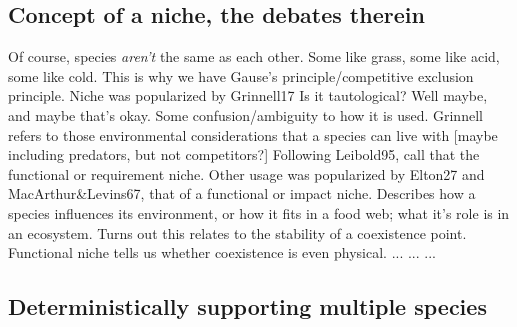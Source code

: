 \documentclass[a4paper,11pt]{article}
\numberwithin{equation}{section} %
\begin{document}
\subsection{Concept of a niche, the debates therein}
Of course, species \emph{aren't} the same as each other. Some like grass, some like acid, some like cold. 
This is why we have Gause's principle/competitive exclusion principle. 
Niche was popularized by Grinnell17
Is it tautological? Well maybe, and maybe that's okay. 
%
Some confusion/ambiguity to how it is used. 
Grinnell refers to those environmental considerations that a species can live with [maybe including predators, but not competitors?]
Following Leibold95, call that the functional or requirement niche. 
%
Other usage was popularized by Elton27 and MacArthur\&Levins67, that of a functional or impact niche. 
Describes how a species influences its environment, or how it fits in a food web; what it's role is in an ecosystem. 
Turns out this relates to the stability of a coexistence point. 
%
Functional niche tells us whether coexistence is even physical. 
...
...
...

\subsection{Deterministically supporting multiple species}
\end{document}
